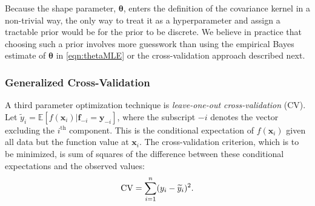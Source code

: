 \documentclass[twocolumn]{svjour3}          %
\newcommand{\bm}[1]{\boldsymbol{#1}}
\newcommand{\Ex}{\mathbb{E}}
\newcommand{\vtheta}{{\bm{\theta}}}
\newcommand{\vf}{\bm{f}}
\newcommand{\vx}{\bm{x}}
\newcommand{\vy}{\bm{y}}
\begin{document}
Because the shape parameter, $\vtheta$, enters the definition of the covariance kernel in a non-trivial way, the only way to treat it as a hyperparameter and assign a tractable prior would be for the prior to be discrete.  We believe in practice that choosing such a prior involves more guesswork than using the empirical Bayes estimate of $\vtheta$ in \eqref{eqn:thetaMLE} or the cross-validation approach described next.


\subsubsection{Generalized Cross-Validation} \label{sec:GCV}
A third parameter optimization technique is \emph{leave-one-out cross-validation} (CV).  Let $\widetilde{y}_i = \Ex[f(\vx_i ) | \vf_{-i} = \vy_{-i}]$, where the subscript $-i$ denotes the vector excluding the $i^{\text{th}}$ component.  This is the conditional expectation of $f(\vx_i )$ given all data but the function value at $\vx_i$.  The cross-validation criterion, which is to be minimized, is sum of squares of the difference between these conditional expectations and the observed values:
\begin{align} \label{FJH:eq:CVA}
\textup{CV} = \sum_{i=1}^n (y_i - \widetilde{y}_i)^2.
\end{align}
\end{document}

